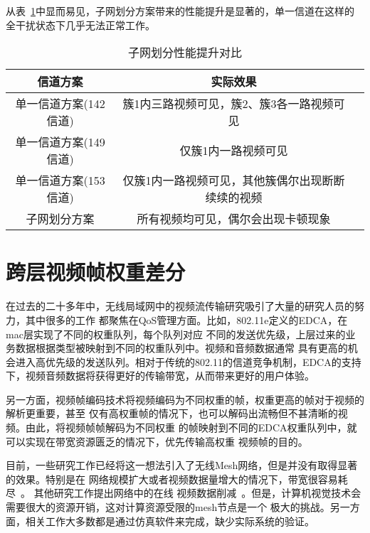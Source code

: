 从表~\ref{tab:subnet_comp}中显而易见，子网划分方案带来的性能提升是显著的，单一信道在这样的
全干扰状态下几乎无法正常工作。
\begin{table}[htbp]
  \centering
  \caption{子网划分性能提升对比}
  \label{tab:subnet_comp}
  \begin{tabular}{|c|c|c|}
  \hline
  信道方案 & 实际效果 \\
  \hline
  单一信道方案(142信道) & 簇1内三路视频可见，簇2、簇3各一路视频可见 \\
  \hline
  单一信道方案(149信道) & 仅簇1内一路视频可见 \\
  \hline
  单一信道方案(153信道) & 仅簇1内一路视频可见，其他簇偶尔出现断断续续的视频 \\
  \hline
  子网划分方案 & 所有视频均可见，偶尔会出现卡顿现象 \\
  \hline
  \end{tabular}
\end{table}

\section{跨层视频帧权重差分}
\label{sec:2}
在过去的二十多年中，无线局域网中的视频流传输研究吸引了大量的研究人员的努力，其中很多的工作
都聚焦在QoS管理方面。比如，802.11e定义的EDCA，在mac层实现了不同的权重队列，每个队列对应
不同的发送优先级，上层过来的业务数据根据类型被映射到不同的权重队列中。视频和音频数据通常
具有更高的机会进入高优先级的发送队列。相对于传统的802.11的信道竞争机制，EDCA的支持
下，视频音频数据将获得更好的传输带宽，从而带来更好的用户体验。

另一方面，视频帧编码技术将视频编码为不同权重的帧，权重更高的帧对于视频的解析更重要，甚至
仅有高权重帧的情况下，也可以解码出流畅但不甚清晰的视频。由此，将视频帧帧解码为不同权重
的帧映射到不同的EDCA权重队列中，就可以实现在带宽资源匮乏的情况下，优先传输高权重
视频帧的目的。

目前，一些研究工作已经将这一想法引入了无线Mesh网络，但是并没有取得显著的效果。特别是在
网络规模扩大或者视频数据量增大的情况下，带宽很容易耗尽~\cite{Iptvhome}。
其他研究工作提出网络中的在线
视频数据削减~\cite{W4}。但是，计算机视觉技术会需要很大的资源开销，这对计算资源受限的mesh节点是一个
极大的挑战。另一方面，相关工作大多数都是通过仿真软件来完成，缺少实际系统的验证。

